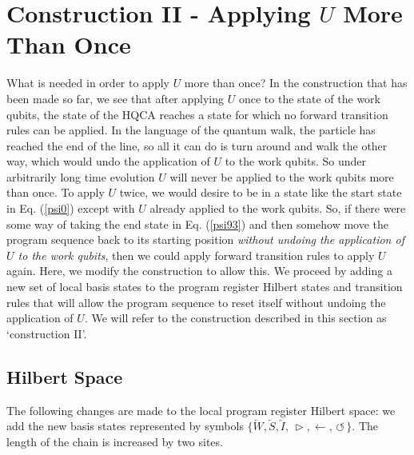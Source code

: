\documentclass[11pt,letterpaper]{article}
\newcommand{\<}{\langle}
\renewcommand{\>}{\rangle}
\newcommand{\tur}{\,\circlearrowleft\,}   %
\newcommand{\rmov}{\,\vartriangleright}
\newcommand{\li}{\overleftarrow{I}}
\newcommand{\lw}{\overleftarrow{W}}
\newcommand{\ls}{\overleftarrow{S}}
\begin{document}
\section{Construction II - Applying $U$ More Than Once} \label{conii}

What is needed in order to apply $U$ more than once? In the construction that has been made so far, we see that after applying $U$ once to the state of the work qubits, the state of the HQCA reaches a state for which no forward transition rules can be applied. In the language of the quantum walk, the particle has reached the end of the line, so all it can do is turn around and walk the other way, which would undo the application of $U$ to the work qubits. So under arbitrarily long time evolution $U$ will never be applied to the work qubits more than once. To apply $U$ twice, we would desire to be in a state like the start state in Eq. (\ref{psi0}) except with $U$ already applied to the work qubits. So, if there were some way of taking the end state in Eq. (\ref{psi93}) and then somehow move the program sequence back to its starting position \emph{without undoing the application of $U$ to the work qubits}, then we could apply forward transition rules to apply $U$ again. Here, we modify the construction to allow this. We proceed by adding a new set of local basis states to the program register Hilbert states and transition rules that will allow the program sequence to reset itself without undoing the application of $U$. We will refer to the construction described in this section as `construction II'.


\subsection{Hilbert Space}

The following changes are made to the local program register Hilbert space: we add the new basis states represented by symbols $\{\lw,\ls,\li,\rmov,\leftarrow, \tur\}$. The length of the chain is increased by two sites.
\end{document}
